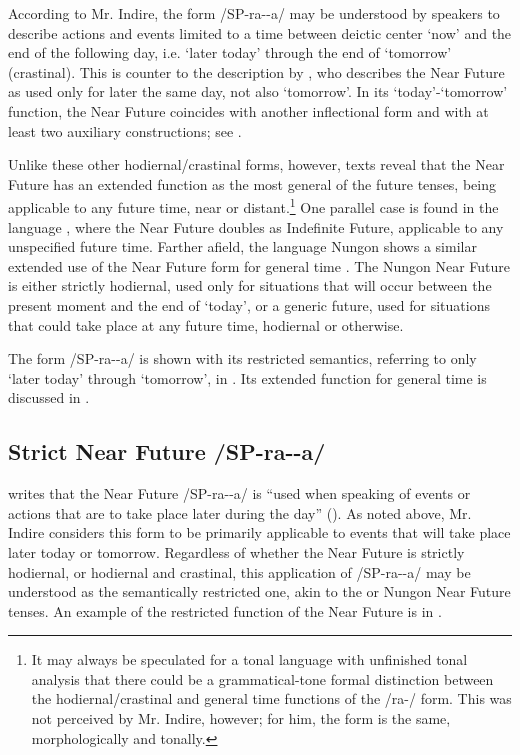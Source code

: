 \documentclass[output=paper]{langsci/langscibook}
\begin{document}
According to Mr. Indire, the form /SP-ra-{\longrule}-a/ may be understood by speakers to describe actions and events limited to a time between deictic center ‘now’ and the end of the following day, i.e. ‘later today’ through the end of ‘tomorrow’ (crastinal). This is counter to the description by \citet[174]{Leung1991}, who describes the Near Future as used only for later the same day, not also ‘tomorrow’. In its ‘today’-‘tomorrow’ function, the Near Future coincides with another inflectional form and with at least two auxiliary constructions; see .

Unlike these other hodiernal/crastinal forms, however,  texts reveal that the Near Future has an extended function as the most general of the future tenses, being applicable to any future time, near or distant.\footnote{It may always be speculated for a tonal language with unfinished tonal analysis that there could be a grammatical-tone formal distinction between the hodiernal/crastinal and general time functions of the /ra-/ form. This was not perceived by Mr. Indire, however; for him, the form is the same, morphologically and tonally.} One parallel case is found in the  language  \citep[19]{Johnson1977}, where the Near Future doubles as Indefinite Future, applicable to any unspecified future time. Farther afield, the  language Nungon shows a similar extended use of the Near Future form for general time \citep{Sarvasy2014}. The Nungon Near Future is either strictly hodiernal, used only for situations that will occur between the present moment and the end of ‘today’, or a generic future, used for situations that could take place at any future time, hodiernal or otherwise. 

The  form /SP-ra-{\longrule}-a/ is shown with its restricted semantics, referring to only ‘later today’ through ‘tomorrow’, in . Its extended function for general time is discussed in .

\subsection{Strict Near Future /SP-ra-{\longrule}-a/}
\label{sec:sarvasy:3.1}

\citeauthor{Leung1991} writes that the Near Future /SP-ra-{\longrule}-a/ is “used when speaking of events or actions that are to take place later during the day” (\citeyear[174]{Leung1991}). As noted above, Mr. Indire considers this form to be primarily applicable to events that will take place later today or tomorrow. Regardless of whether the Near Future is strictly hodiernal, or hodiernal and crastinal, this application of /SP-ra-{\longrule}-a/ may be understood as the semantically restricted one, akin to the  or Nungon Near Future tenses. An example of the restricted function of the  Near Future is in . 
\end{document}
